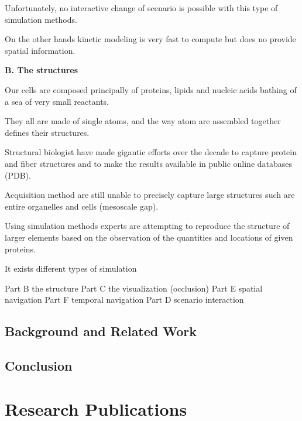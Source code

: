 Unfortunately, no interactive change of scenario is possible with this type of simulation methods.

On the other hands kinetic modeling is very fast to compute but does no provide spatial information.


\textbf{B. The structures}

Our cells are composed principally of proteins, lipids and nucleic acids bathing of a sea of very small reactants.

They all are made of single atoms, and the way atom are assembled together defines their structures.

Structural biologist have made gigantic efforts over the decade to capture protein and fiber structures and to make the results available in public online databases (PDB).


Acquisition method are still unable to precisely capture large structures such are entire organelles and cells (mesoscale gap).

Using simulation methods experts are attempting to reproduce the structure of larger elements based on the observation of the quantities and locations of given proteins.
 

It exists different types of simulation 


Part B the structure
Part C the visualization (occlusion)
Part E spatial navigation 
Part F temporal navigation 
Part D scenario interaction 



\section{Background and Related Work}



\section{Conclusion}

\chapter{Research Publications}


